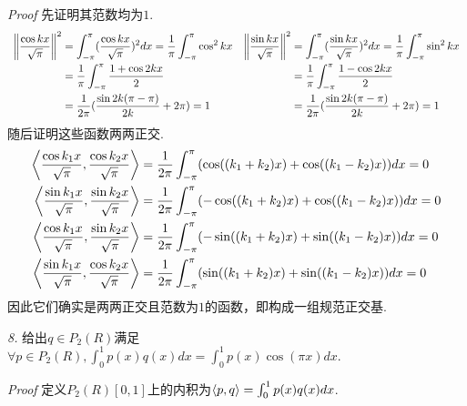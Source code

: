 \textit{Proof}
先证明其范数均为\(1\).
    \begin{equation*}
        \begin{array}{cc}
            \begin{aligned}
                \left\lVert \dfrac{\cos kx}{\sqrt{\pi}} \right\rVert^2 &= \int_{-\pi}^{\pi}(\dfrac{\cos kx}{\sqrt{\pi}})^2dx
                =\dfrac{1}{\pi} \int_{-\pi}^{\pi} \cos^2 kx \\
                &=\dfrac{1}{\pi} \int_{-\pi}^{\pi} \dfrac{1+\cos 2kx}{2} \\
                &=\dfrac{1}{2\pi}(\dfrac{\sin 2k(\pi-\pi)}{2k}+2\pi)=1
            \end{aligned}
            &
            \begin{aligned}
                \left\lVert \dfrac{\sin kx}{\sqrt{\pi}} \right\rVert^2 &= \int_{-\pi}^{\pi}(\dfrac{\sin kx}{\sqrt{\pi}})^2dx
                =\dfrac{1}{\pi} \int_{-\pi}^{\pi} \sin^2 kx \\
                &=\dfrac{1}{\pi} \int_{-\pi}^{\pi} \dfrac{1-\cos 2kx}{2} \\
                &=\dfrac{1}{2\pi}(\dfrac{\sin 2k(\pi-\pi)}{2k}+2\pi)=1
            \end{aligned}
        \end{array}
    \end{equation*}
随后证明这些函数两两正交.
    \begin{align*}
        \left\langle \dfrac{\cos k_1x}{\sqrt{\pi}},\dfrac{\cos k_2x}{\sqrt{\pi}} \right\rangle&
        =\dfrac{1}{2\pi} \int_{-\pi}^{\pi}(\cos((k_1+k_2)x)+\cos((k_1-k_2)x))dx=0 \\
        \left\langle \dfrac{\sin k_1x}{\sqrt{\pi}},\dfrac{\sin k_2x}{\sqrt{\pi}} \right\rangle&
        =\dfrac{1}{2\pi} \int_{-\pi}^{\pi}(-\cos((k_1+k_2)x)+\cos((k_1-k_2)x))dx=0 \\
        \left\langle \dfrac{\cos k_1x}{\sqrt{\pi}},\dfrac{\sin k_2x}{\sqrt{\pi}} \right\rangle&
        =\dfrac{1}{2\pi} \int_{-\pi}^{\pi}(-\sin((k_1+k_2)x)+\sin((k_1-k_2)x))dx=0 \\
        \left\langle \dfrac{\sin k_1x}{\sqrt{\pi}},\dfrac{\cos k_2x}{\sqrt{\pi}} \right\rangle&
        =\dfrac{1}{2\pi} \int_{-\pi}^{\pi}(\sin((k_1+k_2)x)+\sin((k_1-k_2)x))dx=0
    \end{align*}
因此它们确实是两两正交且范数为\(1\)的函数，即构成一组规范正交基.

\newpage

\textit{8.}
给出\(q \in P_2(R)\)满足\(\forall p \in P_2(R),\int_{0}^{1} p(x)q(x)dx=\int_{0}^{1} p(x)\cos(\pi x)dx\).

\textit{Proof}
定义\(P_2(R)[0,1]\)上的内积为\(\left\langle p,q \right\rangle=\int_{0}^{1} p(x)q(x)dx\).

